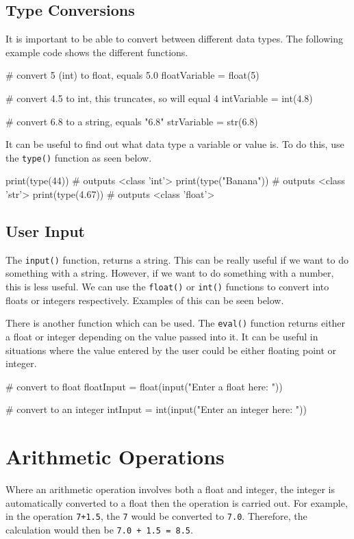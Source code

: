 \subsection*{Type Conversions}
It is important to be able to convert between different data types. The following example code shows the different functions.
\begin{python}
# convert 5 (int) to float, equals 5.0
floatVariable = float(5)

# convert 4.5 to int, this truncates, so will equal 4
intVariable = int(4.8)

# convert 6.8 to a string, equals "6.8"
strVariable = str(6.8)
\end{python}

It can be useful to find out what data type a variable or value is. To do this, use the \verb|type()| function as seen below.
\begin{python}
print(type(44)) # outputs <class 'int'>
print(type("Banana")) # outputs <class 'str'>
print(type(4.67)) # outputs <class 'float'>
\end{python}

\subsection*{User Input}
The \verb|input()| function, returns a string. This can be really useful if we want to do something with a string. However, if we want to do something with a number, this is less useful. We can use the \verb|float()| or \verb|int()| functions to convert into floats or integers respectively. Examples of this can be seen below.

There is another function which can be used. The \verb|eval()| function returns either a float or integer depending on the value passed into it. It can be useful in situations where the value entered by the user could be either floating point or integer.

\begin{python}
# convert to float
floatInput = float(input("Enter a float here: "))

# convert to an integer
intInput = int(input("Enter an integer here: "))
\end{python}

\section*{Arithmetic Operations}
Where an arithmetic operation involves both a float and integer, the integer is automatically converted to a float then the operation is carried out. For example, in the operation \verb|7+1.5|, the \verb|7| would be converted to \verb|7.0|. Therefore, the calculation would then be \verb|7.0 + 1.5 = 8.5|. 

